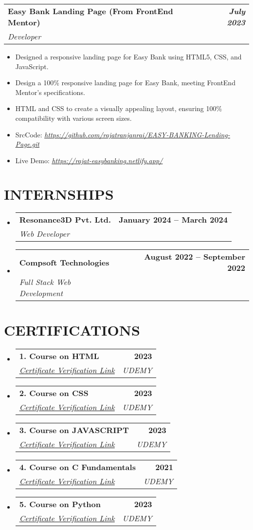 \documentclass[letterpaper,11pt]{article}
\makeatletter
\newcommand{\resumeItem}[1]{
  \item\small{
    {#1 \vspace{-2pt}}
  }
}
\newcommand{\resumeSubheading}[4]{
  \vspace{-2pt}\item
    \begin{tabular*}{1.0\textwidth}[t]{l@{\extracolsep{\fill}}r}
      \textbf{#1} & \textbf{\small #2} \\
      \textit{\small#3} & \textit{\small #4} \\
    \end{tabular*}\vspace{-7pt}
}
\newcommand{\resumeSubHeadingListStart}{\begin{itemize}[leftmargin=0.0in, label={}]}
\newcommand{\resumeSubHeadingListEnd}{\end{itemize}}
\newcommand{\resumeItemListStart}{\begin{itemize}}
\newcommand{\resumeItemListEnd}{\end{itemize}\vspace{-5pt}}
\makeatother
\begin{document}
    
    \resumeSubheading
{Easy Bank Landing Page (From FrontEnd Mentor)}{\textit{July 2023}}
{Developer}{}
\resumeItemListStart
    \resumeItem{Designed a responsive landing page for Easy Bank using HTML5, CSS, and JavaScript.}
    \resumeItem{Design a 100\% responsive landing page for Easy Bank, meeting FrontEnd Mentor's specifications.}
    \resumeItem{HTML and CSS to create a visually appealing layout, ensuring 100\% compatibility with various screen sizes.}
    \resumeItem{SrcCode: \href{https://github.com/rajatranjanrai/EASY-BANKING-Lending-Page.git}{\textit{\underline{https://github.com/rajatranjanrai/EASY-BANKING-Lending-Page.git}}}}
    \resumeItem{Live Demo: \href{https://rajat-easybanking.netlify.app/}{\textit{\underline{https://rajat-easybanking.netlify.app/}}}}
\resumeItemListEnd
\vspace{5pt}

\section{INTERNSHIPS}
  \resumeSubHeadingListStart
    \resumeSubheading
      {Resonance3D Pvt. Ltd.}{January 2024 -- March 2024}
      {Web Developer}{}
    \resumeSubheading
      {Compsoft Technologies}{August 2022 -- September 2022}
      {Full Stack Web Development}{}
  \resumeSubHeadingListEnd

\section{CERTIFICATIONS}
\resumeSubHeadingListStart
    \resumeSubheading
      {1. Course on HTML}{2023} %
      {\href{http://ude.my/UC-64198ff3-c0cd-4354-922b-a0c610b02116}{\underline{Certificate Verification Link}}}{UDEMY}
    \resumeSubheading
      {2. Course on CSS}{2023} %
      {\href{http://ude.my/UC-64198ff3-c0cd-4354-922b-a0c610b02116}{\underline{Certificate Verification Link}}}{UDEMY}
    \resumeSubheading
      {3. Course on JAVASCRIPT}{2023} %
      {\href{http://ude.my/UC-64198ff3-c0cd-4354-922b-a0c610b02116}{\underline{Certificate Verification Link}}}{UDEMY}
    \resumeSubheading
      {4. Course on C Fundamentals}{2021} %
      {\href{}{\underline{Certificate Verification Link}}}{UDEMY}
    \resumeSubheading
      {5. Course on Python}{2023} %
      {\href{http://ude.my/UC-3b24818b-b8cd-4e6d-86d4-5f554d9f8580}{\underline{Certificate Verification Link}}}{UDEMY}
\resumeSubHeadingListEnd
\end{document}
